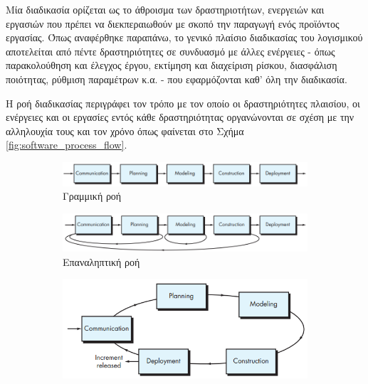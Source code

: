 \documentclass{report}
\begin{document}
Μία διαδικασία ορίζεται ως το άθροισμα των δραστηριοτήτων, ενεργειών και εργασιών που πρέπει να διεκπεραιωθούν με σκοπό την παραγωγή ενός προϊόντος εργασίας. Όπως αναφέρθηκε παραπάνω, το γενικό πλαίσιο διαδικασίας του λογισμικού αποτελείται από πέντε δραστηριότητες σε συνδυασμό με άλλες ενέργειες - όπως παρακολούθηση και έλεγχος έργου, εκτίμηση και διαχείριση ρίσκου, διασφάλιση ποιότητας, ρύθμιση παραμέτρων κ.α. - που εφαρμόζονται καθ' όλη την διαδικασία.

Η ροή διαδικασίας περιγράφει τον τρόπο με τον οποίο οι δραστηριότητες πλαισίου, οι ενέργειες και οι εργασίες εντός κάθε δραστηριότητας οργανώνονται σε σχέση με την αλληλουχία τους και τον χρόνο όπως φαίνεται στο Σχήμα \ref{fig:software_process_flow}.

\begin{figure}[h]
    \begin{subfigure}{\linewidth}
        \centering
        \includegraphics[scale=0.5]{images/software_engineering/linear_process_flow.png}
        \caption{Γραμμική ροή}
        \label{subfig:linear_flow}
    \end{subfigure}\par\medskip
    \begin{subfigure}{\linewidth}
        \centering
        \includegraphics[scale=0.5]{images/software_engineering/iterative_process_flow.png}
        \caption{Επαναληπτική ροή}
        \label{subfig:iterative_flow}
    \end{subfigure}\par\medskip
    \begin{subfigure}{\linewidth}
        \centering
        \includegraphics[width=0.7\linewidth]{images/software_engineering/evolutionery_process_flow.png}

\end{subfigure}
\end{figure}
\end{document}
